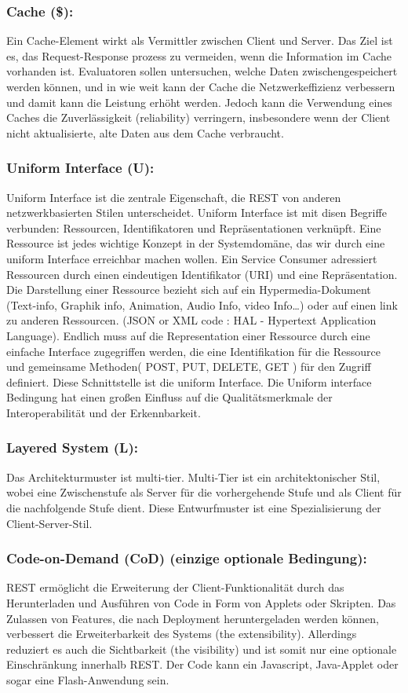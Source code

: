 \documentclass{acmsiggraph}
\begin{document}
\subsubsection{Cache (\$):}
Ein Cache-Element wirkt als Vermittler zwischen Client und Server. Das Ziel ist es, das Request-Response prozess zu vermeiden, wenn die Information im Cache vorhanden ist.
Evaluatoren sollen untersuchen, welche Daten zwischengespeichert werden können, und in wie weit kann der Cache die Netzwerkeffizienz verbessern und damit kann die Leistung erhöht werden.
Jedoch kann die Verwendung eines Caches die Zuverlässigkeit (reliability) verringern, insbesondere wenn der Client nicht aktualisierte, alte Daten aus dem Cache verbraucht.
\subsubsection{Uniform Interface (U):}
Uniform Interface ist die zentrale Eigenschaft, die REST von anderen netzwerkbasierten Stilen unterscheidet.
Uniform Interface ist mit disen Begriffe verbunden: Ressourcen, Identifikatoren und Repräsentationen verknüpft.
Eine Ressource ist jedes wichtige Konzept in der Systemdomäne, das wir durch eine uniform Interface erreichbar machen wollen.
Ein Service Consumer adressiert Ressourcen durch einen eindeutigen Identifikator (URI) und eine Repräsentation. Die Darstellung einer Ressource bezieht sich auf ein Hypermedia-Dokument (Text-info, Graphik info,  Animation, Audio Info, video Info…) oder auf einen link zu anderen Ressourcen. (JSON or XML code : HAL - Hypertext Application Language). 
Endlich muss auf die Representation einer Ressource durch eine einfache Interface zugegriffen werden, die eine Identifikation für die Ressource und gemeinsame Methoden( POST, PUT, DELETE, GET ) für den Zugriff definiert. Diese Schnittstelle ist die uniform Interface. Die Uniform interface Bedingung hat einen großen Einfluss auf die Qualitätsmerkmale der Interoperabilität und der Erkennbarkeit. 

\subsubsection{Layered System (L):}
Das Architekturmuster ist multi-tier. Multi-Tier ist ein architektonischer Stil, wobei eine Zwischenstufe als Server für die vorhergehende Stufe und als Client für die nachfolgende Stufe dient.
Diese  Entwurfmuster ist eine Spezialisierung der Client-Server-Stil. 

\subsubsection{Code-on-Demand (CoD) (einzige optionale Bedingung):}	
REST ermöglicht die Erweiterung der Client-Funktionalität durch das Herunterladen und Ausführen von Code in Form von Applets oder Skripten.
Das Zulassen von Features, die nach Deployment heruntergeladen werden können, verbessert die Erweiterbarkeit des Systems (the extensibility).
Allerdings reduziert es auch die Sichtbarkeit (the visibility) und ist somit nur eine optionale Einschränkung innerhalb REST. Der Code kann ein Javascript, Java-Applet oder sogar eine Flash-Anwendung sein.
\end{document}
